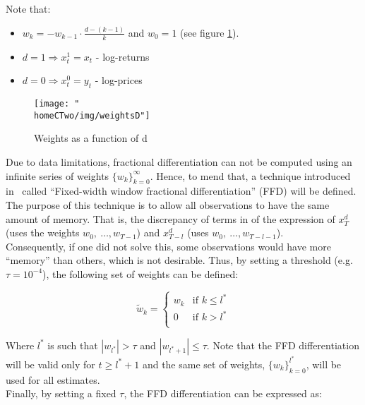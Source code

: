 \documentclass[a4paper]{report}
\newcommand{\homeCTwo}{../../Chapter 2 - FracDiff/Draft}
\begin{document}
Note that:
\begin{itemize}
	\item $w_k = -w_{k - 1} \cdot \frac{d - (k - 1)}{k}$ and $w_0 = 1$ (see 
	figure \ref{fig:weightsD}).
	\item $d = 1 \Rightarrow x_t^1 = x_t$ - log-returns
	\item $d = 0 \Rightarrow x_t^0 = y_t$ - log-prices
\end{itemize}

\begin{figure}[htbp]
\centering
	\texttt{[image: "\\homeCTwo/img/weightsD"]}
	\caption{Weights as a function of d}
	\label{fig:weightsD}
\end{figure}

\vspace{.3cm}

Due to data limitations, fractional differentiation can not be computed using 
an infinite series of weights $\{ w_k \}_{k = 0}^{	\infty}$. Hence, to mend 
that, a technique introduced in~\cite{AdvFML} called ``Fixed-width window 
fractional differentiation'' (FFD) will be defined. The purpose of this 
technique is to allow all observations to have the same amount of memory. 
That is, the discrepancy of terms in of the expression of $x_T^d$ (uses the 
weights $w_0,\ \ldots ,w_{T-1}$) and $x_{T-l}^d$ (uses $w_0,\ \ldots , 
w_{T-l-1}$).\\

Consequently, if one did not solve this, some observations would have more 
``memory'' than others, which is not desirable. Thus, by setting a threshold 
(e.g. $\tau = 10^{-4}$), the following set of weights can be defined:

\begin{equation*}
	\widetilde{w}_k =
	\begin{cases}	 
		w_k & \text{if } k \leq l^*\\
		0 & \text{if } k > l^*\\
	\end{cases}
\end{equation*}

Where $l^*$ is such that $|w_{l^*}| > \tau$ and $|w_{l^* + 1}| \leq \tau$. 
Note that the FFD differentiation will be valid only for $t \geq l^* + 1$ and 
the same set of weights, $\{w_{k}\}_{k = 0}^{l^*}$, will be used for all 
estimates.\\

Finally, by setting a fixed $\tau$, the FFD differentiation can be 
expressed as:
\end{document}
